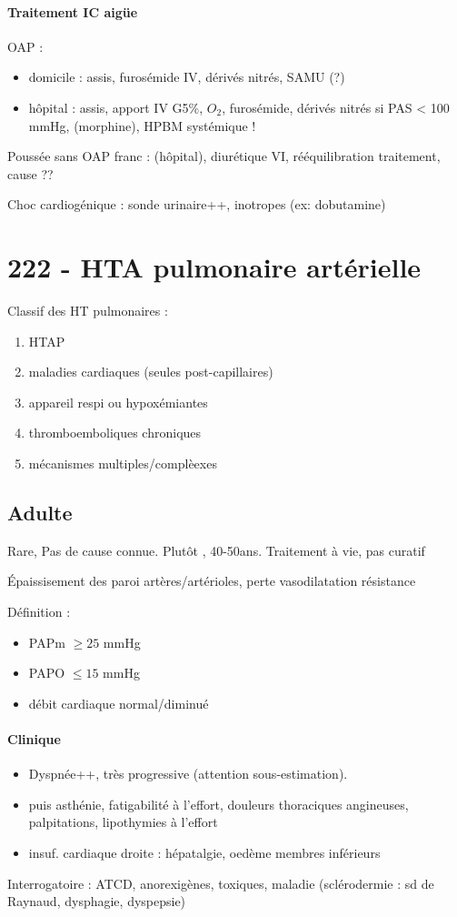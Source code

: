 \paragraph{Traitement IC aigüe}
OAP : 
\begin{itemize}
  \item domicile : assis, furosémide IV, dérivés nitrés, SAMU (?)
  \item hôpital : assis, apport IV G5\%, $O_2$, furosémide, dérivés nitrés si
    PAS < 100 mmHg, (morphine), HPBM systémique !
\end{itemize}
Poussée sans OAP franc : (hôpital), diurétique VI, rééquilibration traitement,
cause ??

Choc cardiogénique : sonde urinaire++, inotropes (ex: dobutamine)

\section{222 - HTA pulmonaire artérielle}%
\label{sec:hta_pulmonaire_arterielle}

Classif des HT pulmonaires : 
\begin{enumerate}
  \item HTAP
  \item maladies cardiaques (seules post-capillaires)
  \item appareil respi ou hypoxémiantes
  \item thromboemboliques chroniques
  \item mécanismes multiples/complèexes
\end{enumerate}
\subsection{Adulte}
Rare, Pas de cause connue. Plutôt \female{}, 40-50ans. Traitement à vie, pas curatif

Épaissisement des paroi artères/artérioles, perte vasodilatation \thus \inc résistance

Définition : 
\begin{itemize}
  \item \gls{PAPm} $\ge 25$ mmHg 
  \item \gls{PAPO} $\le 15$ mmHg
\item débit cardiaque normal/diminué
\end{itemize}

\paragraph{Clinique}
\begin{itemize}
  \item Dyspnée++, très progressive (attention sous-estimation). 
  \item puis asthénie, fatigabilité à l'effort, douleurs thoraciques angineuses,
    palpitations, lipothymies à l'effort
  \item insuf. cardiaque droite : hépatalgie, oedème membres inférieurs
\end{itemize}
Interrogatoire : ATCD, anorexigènes, toxiques, maladie (sclérodermie : sd de
Raynaud, dysphagie, dyspepsie)

